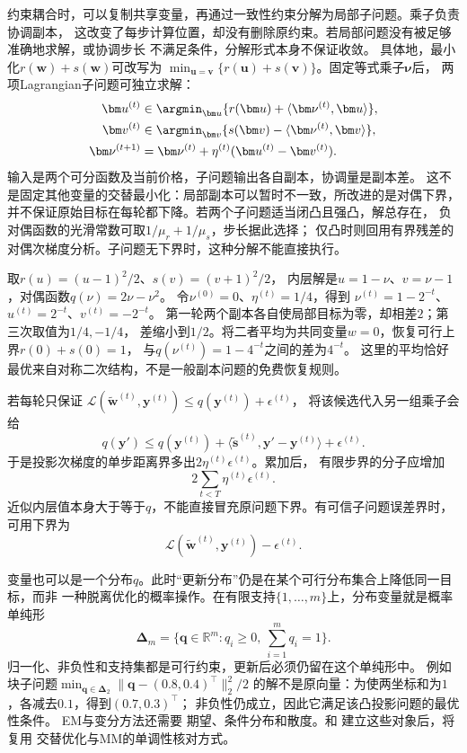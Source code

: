约束耦合时，可以复制共享变量，再通过一致性约束分解为局部子问题。乘子负责协调副本，
这改变了每步计算位置，却没有删除原约束。若局部问题没有被足够准确地求解，或协调步长
不满足条件，分解形式本身不保证收敛。
具体地，最小化$r(\bm w)+s(\bm w)$可改写为
$\min_{\bm u=\bm v}\{r(\bm u)+s(\bm v)\}$。固定等式乘子$\bm\nu$后，
两项Lagrangian子问题可独立求解：
\begin{align}
 \bm u^{(t)}&\in\argmin_{\bm u}\{r(\bm u)+\langle\bm\nu^{(t)},\bm u\rangle\},\nonumber\\
 \bm v^{(t)}&\in\argmin_{\bm v}\{s(\bm v)-\langle\bm\nu^{(t)},\bm v\rangle\},\nonumber\\
 \bm\nu^{(t+1)}&=\bm\nu^{(t)}+\eta^{(t)}(\bm u^{(t)}-\bm v^{(t)}).
 \label{eq:opt-consensus-dual-decomposition}
\end{align}
输入是两个可分函数及当前价格，子问题输出各自副本，协调量是副本差。
这不是固定其他变量的交替最小化：局部副本可以暂时不一致，所改进的是对偶下界，
并不保证原始目标在每轮都下降。若两个子问题适当闭凸且强凸，解总存在，
负对偶函数的光滑常数可取$1/\mu_r+1/\mu_s$，步长据此选择；
仅凸时则回用有界残差的对偶次梯度分析。子问题无下界时，这种分解不能直接执行。

取$r(u)=(u-1)^2/2$、$s(v)=(v+1)^2/2$，
内层解是$u=1-\nu$、$v=\nu-1$，对偶函数$q(\nu)=2\nu-\nu^2$。
令$\nu^{(0)}=0$、$\eta^{(t)}=1/4$，得到
$\nu^{(t)}=1-2^{-t}$、$u^{(t)}=2^{-t}$、$v^{(t)}=-2^{-t}$。
第一轮两个副本各自使局部目标为零，却相差$2$；第三次取值为$1/4,-1/4$，
差缩小到$1/2$。将二者平均为共同变量$w=0$，恢复可行上界$r(0)+s(0)=1$，
与$q(\nu^{(t)})=1-4^{-t}$之间的差为$4^{-t}$。
这里的平均恰好最优来自对称二次结构，不是一般副本问题的免费恢复规则。

若每轮只保证
$\mathcal L(\widetilde{\bm w}^{(t)},\bm y^{(t)})\leq q(\bm y^{(t)})+\epsilon^{(t)}$，
将该候选代入另一组乘子会给
\[
 q(\bm y')\leq q(\bm y^{(t)})
 +\langle\widetilde{\bm s}^{(t)},\bm y'-\bm y^{(t)}\rangle+\epsilon^{(t)}.
\]
于是投影次梯度的单步距离界多出$2\eta^{(t)}\epsilon^{(t)}$。累加后，
有限步界的分子应增加
\[
 2\sum_{t<T}\eta^{(t)}\epsilon^{(t)}.
\]
近似内层值本身大于等于$q$，不能直接冒充原问题下界。有可信子问题误差界时，
可用下界为
\[
 \mathcal L(\widetilde{\bm w}^{(t)},\bm y^{(t)})-\epsilon^{(t)}.
\]

变量也可以是一个分布$q$。此时“更新分布”仍是在某个可行分布集合上降低同一目标，而非
一种脱离优化的概率操作。在有限支持$\{1,\ldots,m\}$上，分布变量就是概率单纯形
\[
  \bm{\Delta}_m
  =\{\bm{q}\in\mathbb{R}^m:q_i\geq0,\ \sum_{i=1}^m q_i=1\}.
\]
归一化、非负性和支持集都是可行约束，更新后必须仍留在这个单纯形中。
例如块子问题$\min_{\bm q\in\bm\Delta_2}\|\bm q-(0.8,0.4)^\top\|_2^2/2$
的解不是原向量：为使两坐标和为$1$，各减去$0.1$，得到$(0.7,0.3)^\top$；
非负性仍成立，因此它满足该凸投影问题的最优性条件。
EM与变分方法还需要
期望、条件分布和散度。和
建立这些对象后，将复用
交替优化与MM的单调性核对方式。


